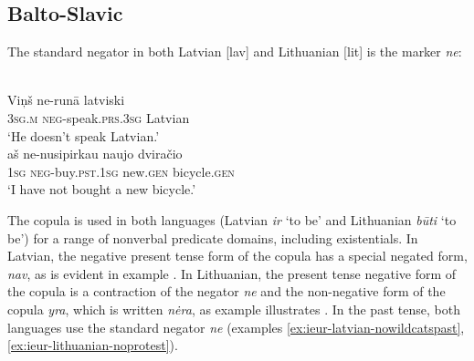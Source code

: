 \documentclass[output=paper]{langsci/langscibook}
\begin{document}
\subsection{Balto-Slavic}\label{sec:ieur-4.3}

The standard negator in both Latvian [lav] and Lithuanian [lit] is the marker \textit{ne}:
%
\begin{exe}
\ex\label{ex:ieur-latvian-speak}
\\
    \gll Viņš ne-runā latviski \\
\textsc{3sg.m} \textsc{neg}-speak.\textsc{prs.3sg} Latvian \\
    \glt `He doesn't speak Latvian.' 
\ex\label{ex:ieur-lithuanian-bicycle}
\\
    \gll aš ne-nusipirkau naujo dviračio \\
\textsc{1sg} \textsc{neg}-buy.\textsc{pst.1sg}  new.\textsc{gen} bicycle.\textsc{gen} \\
    \glt `I have not bought a new bicycle.' 
    \end{exe}
%
The copula is used in both languages (Latvian \textit{ir} `to be' and
Lithuanian \textit{būti} `to be') for a range of nonverbal predicate
domains, including existentials. In Latvian, the negative
present tense form of the copula has a special negated form, \textit{nav},
as is evident in example . In
Lithuanian, the present tense negative form of the copula is
a contraction of the negator \textit{ne} and the non-negative form of the
copula \textit{yra}, which is written \textit{nėra}, as example
 illustrates
\citep[1976]{Mathiassen1996}. In the past tense, both languages use the
standard negator \textit{ne} (examples
\ref{ex:ieur-latvian-nowildcatspast}, \ref{ex:ieur-lithuanian-noprotest}). 
\end{document}

